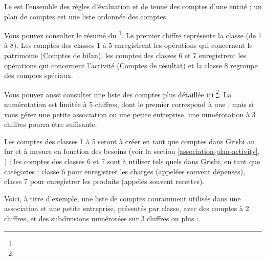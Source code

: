 Le  est l'ensemble des règles d'évaluation et de tenue des comptes d’une entité ; un plan de comptes est une liste ordonnée des comptes.

Vous pouvez consulter le résumé du \footnote{\urlPlanDeComptes{}}.
Le premier chiffre représente la classe (de 1 à 8). Les comptes des classes 1 à 5 enregistrent les opérations qui concernent le patrimoine (Comptes de bilan), les comptes des classes 6 et 7 enregistrent les opérations qui concernent l’activité (Comptes de résultat) et la classe 8 regroupe des comptes spéciaux.

Vous pouvez aussi consulter  une liste des comptes plus détaillée ici \footnote{\urlListeComptes{}}. La numérotation est limitée à 5 chiffres, dont le premier correspond à une , mais si vous gérez une petite association ou une petite entreprise, une numérotation à 3 chiffres pourra être suffisante.

Les comptes des classes 1 à 5 seront à créer en tant que comptes dans Grisbi au fur et à mesure en fonction des besoins (voir la section \vref{association-plan-activity}, ) ; les comptes des classes 6 et 7 sont à utiliser tels quels dans Grisbi, en tant que catégories : classe 6 pour enregistrer les charges (appelées souvent dépenses), classe 7 pour enregistrer les produits (appelés souvent recettes).


Voici, à titre d’exemple, une liste de comptes couramment utilisés dans une association et une petite entreprise, présentés par classe, avec des comptes à 2 chiffres, et des subdivisions numérotées sur 3 chiffres ou plus :

